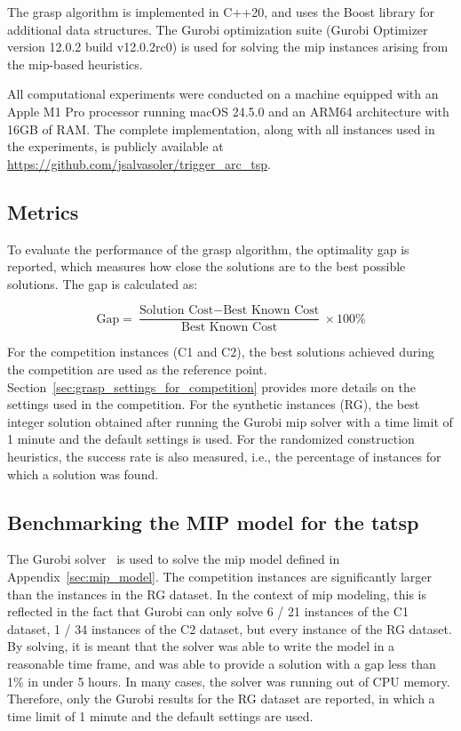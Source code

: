 \documentclass[twocolumn, switch]{article} %
\begin{document}
The \gls{grasp} algorithm is implemented in C++20, and uses the Boost library for additional data structures.
The Gurobi optimization suite (Gurobi Optimizer version 12.0.2 build v12.0.2rc0) is used for solving the \gls{mip} instances arising from the \gls{mip}-based heuristics.

All computational experiments were conducted on a machine equipped with an Apple M1 Pro processor running macOS 24.5.0 and an ARM64 architecture with 16GB of RAM.
The complete implementation, along with all instances used in the experiments, is publicly available at \url{https://github.com/jsalvasoler/trigger_arc_tsp}.

\subsection{Metrics}

To evaluate the performance of the \gls{grasp} algorithm, the optimality gap is reported, which measures how close the solutions are to the best possible solutions. The gap is calculated as:

\begin{equation}
\text{Gap} = \frac{\text{Solution Cost} - \text{Best Known Cost}}{\text{Best Known Cost}} \times 100\%
\end{equation}

For the competition instances (C1 and C2), the best solutions achieved during the competition are used as the reference point. Section~\ref{sec:grasp_settings_for_competition} provides more details on the settings used in the competition.
For the synthetic instances (RG), the best integer solution obtained after running the Gurobi \gls{mip} solver with a time limit of 1 minute and the default settings is used.
For the randomized construction heuristics, the success rate is also measured, i.e., the percentage of instances for which a solution was found.

\subsection{Benchmarking the MIP model for the \gls{tatsp}}

The Gurobi solver~\cite{gurobi} is used to solve the \gls{mip} model defined in Appendix~\ref{sec:mip_model}.
The competition instances are significantly larger than the instances in the RG dataset. In the context of \gls{mip} modeling, this is reflected in the fact
that Gurobi can only solve 6 / 21 instances of the C1 dataset, 1 / 34 instances of the C2 dataset, but every instance of the RG dataset.
By solving, it is meant that the solver was able to write the model in a reasonable time frame, and was able to provide a solution with a gap less than 1\% in under 5 hours.
In many cases, the solver was running out of CPU memory.
Therefore, only the Gurobi results for the RG dataset are reported, in which a time limit of 1 minute and the default settings are used.
\end{document}
